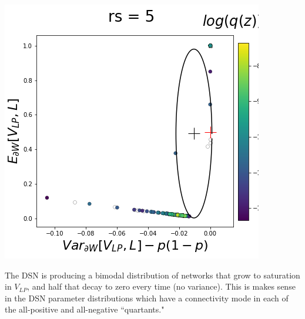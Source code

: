 \documentclass[11pt]{article}
\begin{document}
\begin{center}
\includegraphics[scale=0.33]{figs/T_x_SC_reduced_c=0_p=50_rs=5.png}
\end{center}

The DSN is producing a bimodal distribution of networks that grow to saturation in $V_{LP}$, and half that decay to zero every time (no variance).  This is makes sense in the DSN parameter distributions which have a connectivity mode in each of the all-positive and all-negative ``quartants." 
\end{document}
